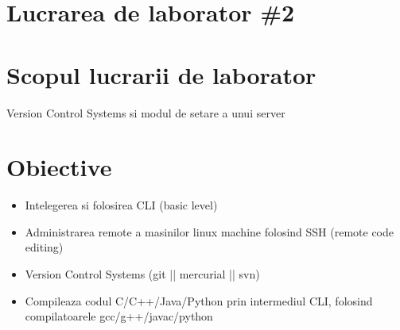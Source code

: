 \section*{Lucrarea de laborator \#2}

\section{Scopul lucrarii de laborator}

Version Control Systems si modul de setare a unui server





\section{Obiective}
\begin{itemize}
	\item Intelegerea si folosirea CLI (basic level)
	\item Administrarea remote a masinilor linux machine folosind SSH (remote code editing)
	\item Version Control Systems (git || mercurial || svn)
	\item Compileaza codul C/C++/Java/Python prin intermediul CLI, folosind compilatoarele gcc/g++/javac/python
\end{itemize}
\clearpage